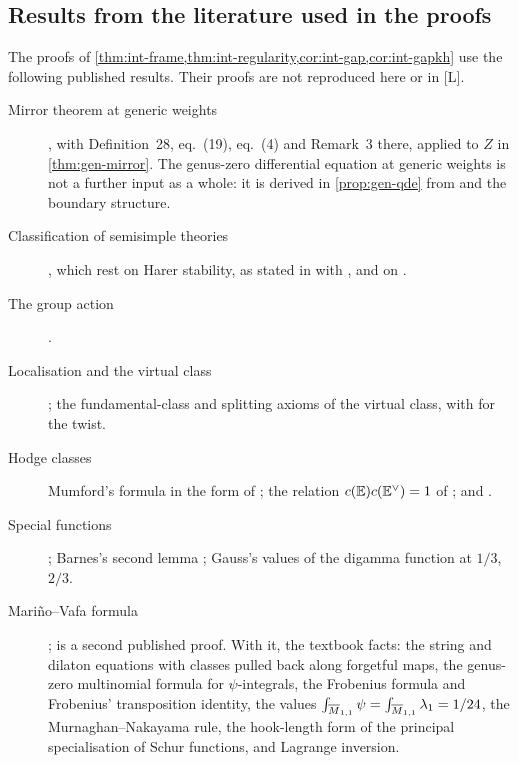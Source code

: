 
\subsection{Results from the literature used in the proofs}
\label{sec:int-inputs}

The proofs of \cref{thm:int-frame,thm:int-regularity,cor:int-gap,cor:int-gapkh} use the following published results. Their proofs are not reproduced here or in \textup{[L]}.
\begin{description}
\item[Mirror theorem at generic weights] \cite[Theorem~31]{CCIT15}, with Definition~28, eq.~(19), eq.~(4) and Remark~3 there, applied to $Z$ in \cref{thm:gen-mirror}. The genus-zero differential equation at generic weights is not a further input as a whole: it is derived in \cref{prop:gen-qde} from \cite[Lemma~1]{Pan98} and the boundary structure.
\item[Classification of semisimple theories] \cite[Theorem~(2), Proposition~8.7(ii), 2.17--2.19, (2.15)]{Tel12}, which rest on Harer stability, as stated in \cite[Propositions~(2.1), (2.2)]{Loo96} with \cite{Har85,Iva90}, and on \cite[Theorem~1.1.1]{MW07}.
\item[The group action] \cite[Definitions~2.2, 2.5, 2.13, Proposition~2.14, Section~3.2 and (5)]{PPZ15}.
\item[Localisation and the virtual class] \cite[formula~(1), Appendices~A, C]{GP99}; the fundamental-class and splitting axioms of the virtual class, with \cite[Appendix~1 (iv)--(vi)]{CG07} for the twist.
\item[Hodge classes] Mumford's formula in the form of \cite[Theorem (Mumford), Section~1.1]{FP00}; the relation $c(\mathbb{E})c(\mathbb{E}^\vee)=1$ of \cite[(5.4), (5.5)]{Mum83}; and \cite[Theorem~4]{FP00}.
\item[Special functions] \cite[Eq.~15.6.7]{DLMF}; Barnes's second lemma \cite{Bar10}; Gauss's values of the digamma function at $1/3$, $2/3$.
\item[Mari\~no--Vafa formula] \cite[eq.~(1)--(3)]{LLZ03}; \cite[Theorem~1]{OP04} is a second published proof. With it, the textbook facts: the string and dilaton equations with classes pulled back along forgetful maps, the genus-zero multinomial formula for $\psi$-integrals, the Frobenius formula and Frobenius' transposition identity, the values $\int_{\overline{M}_{1,1}}\psi=\int_{\overline{M}_{1,1}}\lambda_1=1/24$, the Murnaghan--Nakayama rule, the hook-length form of the principal specialisation of Schur functions, and Lagrange inversion.
\end{description}
